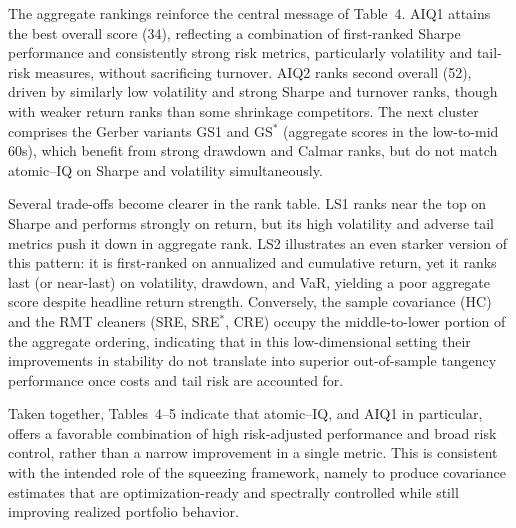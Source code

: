 \documentclass[12pt,letterpaper]{article}
\begin{document}
The aggregate rankings reinforce the central message of Table~4. AIQ1 attains the best overall score (34), reflecting a combination of first-ranked Sharpe performance and consistently strong risk metrics, particularly volatility and tail-risk measures, without sacrificing turnover. AIQ2 ranks second overall (52), driven by similarly low volatility and strong Sharpe and turnover ranks, though with weaker return ranks than some shrinkage competitors. The next cluster comprises the Gerber variants GS1 and GS$^{\ast}$ (aggregate scores in the low-to-mid 60s), which benefit from strong drawdown and Calmar ranks, but do not match atomic--IQ on Sharpe and volatility simultaneously.

Several trade-offs become clearer in the rank table. LS1 ranks near the top on Sharpe and performs strongly on return, but its high volatility and adverse tail metrics push it down in aggregate rank. LS2 illustrates an even starker version of this pattern: it is first-ranked on annualized and cumulative return, yet it ranks last (or near-last) on volatility, drawdown, and VaR, yielding a poor aggregate score despite headline return strength. Conversely, the sample covariance (HC) and the RMT cleaners (SRE, SRE$^{\ast}$, CRE) occupy the middle-to-lower portion of the aggregate ordering, indicating that in this low-dimensional setting their improvements in stability do not translate into superior out-of-sample tangency performance once costs and tail risk are accounted for.

Taken together, Tables~4--5 indicate that atomic--IQ, and AIQ1 in particular, offers a favorable combination of high risk-adjusted performance and broad risk control, rather than a narrow improvement in a single metric. This is consistent with the intended role of the squeezing framework, namely to produce covariance estimates that are optimization-ready and spectrally controlled while still improving realized portfolio behavior.
\end{document}
